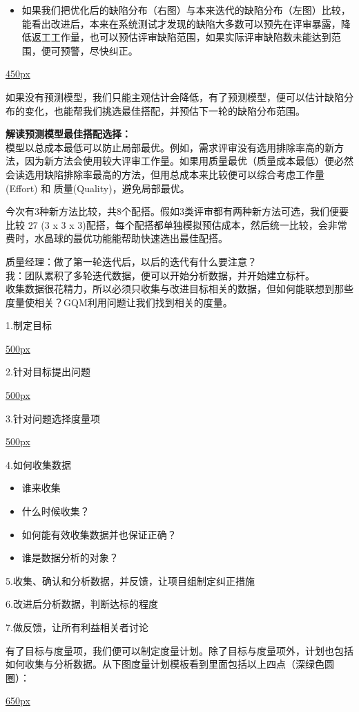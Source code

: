 \documentclass[]{article}
\providecommand{\tightlist}{%
  \setlength{\itemsep}{0pt}\setlength{\parskip}{0pt}}
\begin{document}
\begin{itemize}
\tightlist
\item
  如果我们把优化后的缺陷分布（右图）与本来迭代的缺陷分布（左图）比较，能看出改进后，本来在系统测试才发现的缺陷大多数可以预先在评审暴露，降低返工工作量，也可以预估评审缺陷范围，如果实际评审缺陷数未能达到范围，便可预警，尽快纠正。
\end{itemize}

\href{文件:MTKL.png}{450px}

如果没有预测模型，我们只能主观估计会降低，有了预测模型，便可以估计缺陷分布的变化，也能帮我们挑选最佳搭配，并预估下一轮的缺陷分布范围。

\textbf{解读预测模型最佳搭配选择：}\\
模型以总成本最低可以防止局部最优。例如，需求评审没有选用排除率高的新方法，因为新方法会使用较大评审工作量。如果用质量最优（质量成本最低）便必然会读选用缺陷排除率最高的方法，但用总成本来比较便可以综合考虑工作量(Effort)
和 质量(Quality)，避免局部最优。

今次有3种新方法比较，共8个配搭。假如3类评审都有两种新方法可选，我们便要比较
27 (3 x 3 x
3)配搭，每个配搭都单独模拟预估成本，然后统一比较，会非常费时，水晶球的最优功能能帮助快速选出最佳配搭。

质量经理：做了第一轮迭代后，以后的迭代有什么要注意？\\
我：团队累积了多轮迭代数据，便可以开始分析数据，并开始建立标杆。\\

收集数据很花精力，所以必须只收集与改进目标相关的数据，但如何能联想到那些度量使相关？GQM利用问题让我们找到相关的度量。

1.制定目标

\href{文件:Gqm1Screenshot_2023-11-01_113815.jpg}{500px}

2.针对目标提出问题

\href{文件:Gqm2Screenshot_2023-11-01_114014.jpg}{500px}

3.针对问题选择度量项

\href{文件:Gqm3Screenshot_2023-11-01_114048.jpg}{500px}

4.如何收集数据

\begin{itemize}
\tightlist
\item
  谁来收集
\item
  什么时候收集？
\item
  如何能有效收集数据并也保证正确？
\item
  谁是数据分析的对象？
\end{itemize}

5.收集、确认和分析数据，并反馈，让项目组制定纠正措施

6.改进后分析数据，判断达标的程度

7.做反馈，让所有利益相关者讨论

有了目标与度量项，我们便可以制定度量计划。除了目标与度量项外，计划也包括如何收集与分析数据。从下图度量计划模板看到里面包括以上四点（深绿色圆圈）：

\href{文件:13_MA_plan_Screenshot_2023-10-26_211815.jpg}{650px}
\end{document}
